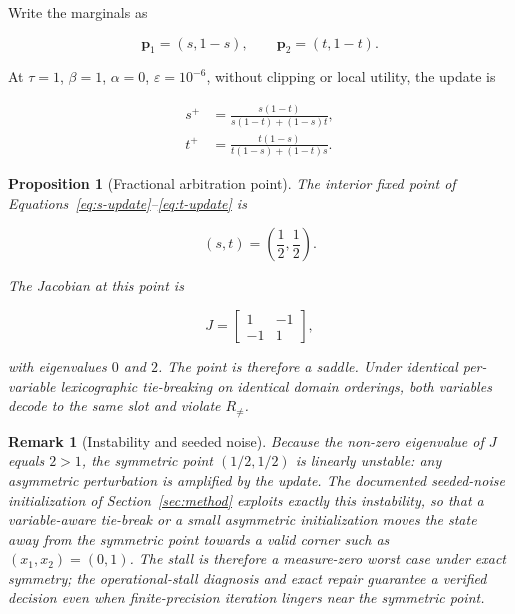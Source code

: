 \documentclass[pdflatex,sn-mathphys-num,iicol,oneside]{sn-jnl}
\newtheorem{proposition}{Proposition}
\newtheorem{remark}{Remark}
\begin{document}
Write the marginals as

\begin{equation}
\bm{p}_1=(s,1-s),
\qquad
\bm{p}_2=(t,1-t).
\end{equation}

At $\tau=1$, $\beta=1$, $\alpha=0$, $\varepsilon=10^{-6}$, without clipping or local
utility, the update is

\begin{align}
s^{+}
&=
\frac{s(1-t)}
{s(1-t)+(1-s)t},
\label{eq:s-update}\\
t^{+}
&=
\frac{t(1-s)}
{t(1-s)+(1-t)s}.
\label{eq:t-update}
\end{align}

\begin{proposition}[Fractional arbitration point]
The interior fixed point of
Equations~\eqref{eq:s-update}--\eqref{eq:t-update} is

\begin{equation}
(s,t)
=
\left(
\frac{1}{2},
\frac{1}{2}
\right).
\end{equation}

The Jacobian at this point is

\begin{equation}
J
=
\begin{bmatrix}
1 & -1\\
-1 & 1
\end{bmatrix},
\end{equation}

with eigenvalues $0$ and $2$. The point is therefore a saddle.
Under identical per-variable lexicographic tie-breaking on identical
domain orderings, both variables decode to the same slot and violate
$R_{\neq}$.
\end{proposition}

\begin{remark}[Instability and seeded noise]
Because the non-zero eigenvalue of $J$ equals $2>1$, the symmetric
point $(1/2,1/2)$ is linearly unstable: any asymmetric perturbation is
amplified by the update. The documented seeded-noise initialization of
Section~\ref{sec:method} exploits exactly this instability, so that a
variable-aware tie-break or a small asymmetric initialization moves the
state away from the symmetric point towards a valid corner such as
$(x_1,x_2)=(0,1)$. The stall is therefore a measure-zero worst case
under exact symmetry; the operational-stall diagnosis and exact repair
guarantee a verified decision even when finite-precision iteration
lingers near the symmetric point.
\end{remark}
\end{document}
